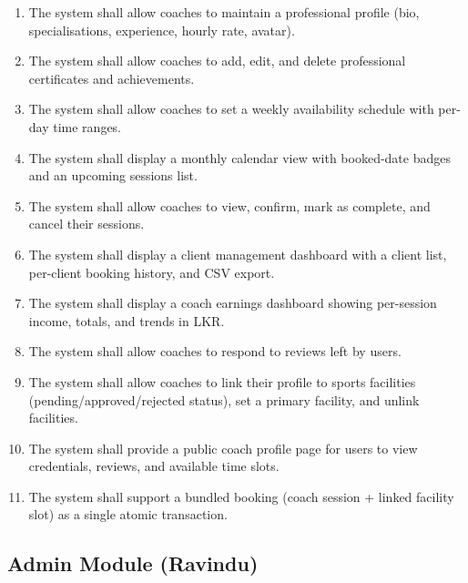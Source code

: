 \documentclass[12pt,a4paper]{report}
\begin{document}
\begin{enumerate}[leftmargin=1.5cm]
  \item The system shall allow coaches to maintain a professional profile (bio, specialisations, experience, hourly rate, avatar).
  \item The system shall allow coaches to add, edit, and delete professional certificates and achievements.
  \item The system shall allow coaches to set a weekly availability schedule with per-day time ranges.
  \item The system shall display a monthly calendar view with booked-date badges and an upcoming sessions list.
  \item The system shall allow coaches to view, confirm, mark as complete, and cancel their sessions.
  \item The system shall display a client management dashboard with a client list, per-client booking history, and CSV export.
  \item The system shall display a coach earnings dashboard showing per-session income, totals, and trends in LKR.
  \item The system shall allow coaches to respond to reviews left by users.
  \item The system shall allow coaches to link their profile to sports facilities (pending/approved/rejected status), set a primary facility, and unlink facilities.
  \item The system shall provide a public coach profile page for users to view credentials, reviews, and available time slots.
  \item The system shall support a bundled booking (coach session + linked facility slot) as a single atomic transaction.
\end{enumerate}

\subsection{Admin Module (Ravindu)}
\end{document}
